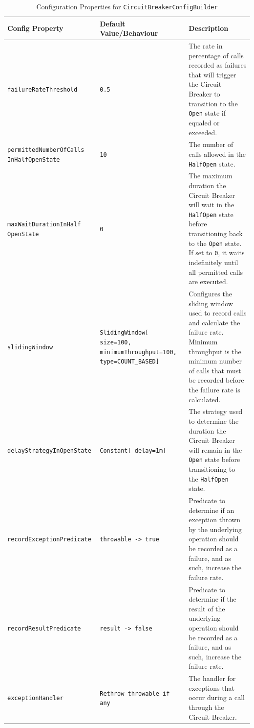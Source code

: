 \begin{table}[!htb]
    \centering
    \caption{Configuration Properties for \texttt{CircuitBreakerConfigBuilder}}
    \label{tab:cbreaker-config-builder}
    \vspace{0.3cm}
    \begin{tabular}{|p{5cm}|p{5cm}|p{6cm}|}
        \hline
        \textbf{Config Property}          & \textbf{Default Value/Behaviour} & \textbf{Description}                                                                                                                                        \\ \hline
        \texttt{failureRateThreshold}     & \texttt{0.5}                     & The rate in percentage of calls recorded as failures that will trigger the Circuit Breaker to transition to the \texttt{Open} state if equaled or exceeded. \\ \hline
        \texttt{permittedNumberOfCalls InHalfOpenState} & \texttt{10} & The number of calls
        allowed in the \texttt{HalfOpen} state. \\ \hline
        \texttt{maxWaitDurationInHalf OpenState} & \texttt{0} & The maximum duration
        the Circuit Breaker will wait in the \texttt{HalfOpen} state before transitioning back to the \texttt{Open} state.
        If set to \texttt{0}, it waits indefinitely until all permitted calls are executed. \\ \hline
        \texttt{slidingWindow} & \texttt{SlidingWindow[ size=100, minimumThroughput=100, type=COUNT\_BASED]}
        & Configures the sliding window used to record calls and calculate the failure rate.
        Minimum throughput is the minimum number of calls
        that must be recorded before the failure rate is calculated.
        \\ \hline
        \texttt{delayStrategyInOpenState} & \texttt{Constant[ delay=1m]}     & The strategy used to determine the duration the Circuit Breaker will remain in the \texttt{Open} state before transitioning to the \texttt{HalfOpen} state. \\ \hline
        \texttt{recordExceptionPredicate} & \texttt{throwable ->
            true} & Predicate
        to determine if an exception thrown by the underlying operation should be recorded as a failure, and as such, increase the failure rate. \\ \hline
        \texttt{recordResultPredicate} & \texttt{result ->
            false} & Predicate
        to determine if the result of the underlying operation should be recorded as a failure, and as such, increase the failure rate. \\ \hline
        \texttt{exceptionHandler} & \texttt{Rethrow throwable
        if any} & The handler for exceptions that occur during a call through the Circuit Breaker. \\ \hline
    \end{tabular}
\end{table}

